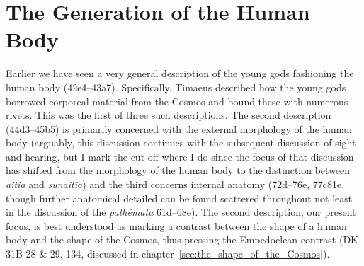 
\section{The Generation of the Human Body} %
\label{sec:structuring_the_human_body}

Earlier we have seen a very general description of the young gods fashioning the human body (42e4--43a7). Specifically, Timaeus described how the young gods borrowed corporeal material from the Cosmos and bound these with numerous rivets. This was the first of three such descriptions. The second description (44d3--45b5) is primarily concerned with the external morphology of the human body (arguably, this discussion continues with the subsequent discussion of sight and hearing, but I mark the cut off where I do since the focus of that discussion has shifted from the morphology of the human body to the distinction between \emph{aitia} and \emph{sunaitia}) and the third concerns internal anatomy (72d--76e, 77c81e, though further anatomical detailed can be found scattered throughout not least in the discussion of the \emph{pathēmata} 61d--68e). The second description, our present focus, is best understood as marking a contrast between the shape of a human body and the shape of the Cosmos, thus pressing the Empedoclean contrast (DK 31B 28 \& 29, 134, discussed in chapter~\ref{sec:the_shape_of_the_Cosmos}).



